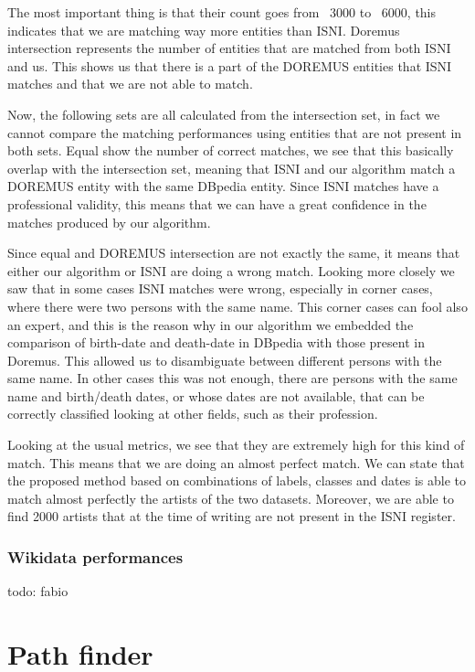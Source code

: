 \documentclass[paper=a4, fontsize=11pt]{scrartcl}
\begin{document}
The most important thing is that their count goes from ~3000 to ~6000, this indicates that we are matching way more entities than ISNI.
Doremus intersection represents the number of entities that are matched from both ISNI and us. This shows us that there is a part of the DOREMUS entities that ISNI matches and that we are not able to match.

Now, the following sets are all calculated from the intersection set, in fact we cannot compare the matching performances using entities that are not present in both sets.
Equal show the number of correct matches, we see that this basically overlap with the intersection set, meaning that ISNI and our algorithm match a DOREMUS entity with the same DBpedia entity. Since ISNI matches have a professional validity, this means that we can have a great confidence in the matches produced by our algorithm.

Since equal and DOREMUS intersection are not exactly the same, it means that either our algorithm or ISNI are doing a wrong match. Looking more closely we saw that in some cases ISNI matches were wrong, especially in corner cases, where there were two persons with the same name. This corner cases can fool also an expert, and this is the reason why in our algorithm we embedded the comparison of birth-date and death-date in DBpedia with those present in Doremus. This allowed us to disambiguate between different persons with the same name. In other cases this was not enough, there are persons with the same name and birth/death dates, or whose dates are not available, that can be correctly classified looking at other fields, such as their profession.

Looking at the usual metrics, we see that they are extremely high for this kind of match. This means that we are doing an almost perfect match.
We can state that the proposed method based on combinations of labels, classes and dates is able to match almost perfectly the artists of the two datasets. Moreover, we are able to find 2000 artists that at the time of writing are not present in the ISNI register.
\subsubsection{Wikidata performances}
todo: fabio

\section{Path finder}
\end{document}
